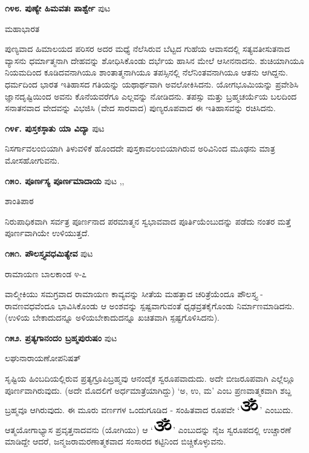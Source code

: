 \medskip
\noindent\textbf{೧೪೮. ಪುಣ್ಯೇ ಹಿಮವತಃ ಪಾರ್ಶ್ವೇ} \hfill ಪುಟ \pageref{118}

\hfill ಮಹಾಭಾರತ

ಪುಣ್ಯವಾದ ಹಿಮಾಲಯದ ಪರಿಸರ ಅದರ ಮಧ್ಯೆ ನೆಲೆಸಿರುವ ಬೆಟ್ಟದ ಗುಹೆಯ ಆವಾಸದಲ್ಲಿ ಸತ್ಯವತೀಸುತನಾದ ವ್ಯಾಸನು ಧರ್ಮಾತ್ಮನಾಗಿ ದೇಹವನ್ನು ಶೋಧಿಸಿಕೊಂಡು ದರ್ಭೆಯ ಹಾಸಿನ ಮೇಲೆ ಆಸೀನನಾದನು. ಶುಚಿಯಾಗಿಯೂ ನಿಯಮದಿಂದ ಕೂಡಿದವನಾಗಿಯೂ ಶಾಂತಾತ್ಮನಾಗಿಯೂ ತಪಸ್ಸಿನಲ್ಲಿ ನೆಲೆನಿಂತವನಾಗಿಯೂ ಆತನು ಆಗಿದ್ದನು. ಧರ್ಮದಿಂದ ಭಾರತ ಇತಿಹಾಸದ ಗತಿಯನ್ನು ಯಥಾರ್ಥವಾಗಿ ಅವಲೋಕಿಸಿದನು. ಯೋಗಭೂಮಿಯನ್ನು ಪ್ರವೇಶಿಸಿ ಜ್ಞಾನದೃಷ್ಟಿಯಿಂದ ಅವನು ಕೊನೆಯವರೆಗೂ ಎಲ್ಲವನ್ನು ನೋಡಿದನು. ತಪಸ್ಸು ಮತ್ತು ಬ್ರಹ್ಮಚರ್ಯೆಯ ಬಲದಿಂದ ಸನಾತನವಾದ ವೇದವನ್ನು ವಿಭಜಿಸಿ (ವೇದ ಸಾರವಾದ) ಪುಣ್ಯರೂಪವಾದ ಈ ಇತಿಹಾಸವನ್ನು ರಚಿಸಿದನು.

\medskip
\noindent\textbf{೧೪೯. ಪುಸ್ತಕಸ್ಠಾತು ಯಾ ವಿದ್ಯಾ} \hfill ಪುಟ \pageref{114}

ನಿಸರ್ಗಾವಲಂಬಿಯಾಗಿ ತಿಳುವಳಿಕೆ ಹೊಂದದೇ ಪುಸ್ತಕಾವಲಂಬಿಯಾಗಿರುವ ಅರಿವಿನಿಂದ ಮೂಢನು ಮಾತ್ರ ಮೋಸಹೋಗುವನು.

\medskip
\noindent\textbf{೧೫೦. ಪೂರ್ಣಸ್ಯ ಪೂರ್ಣಮಾದಾಯ} \hfill ಪುಟ \pageref{23},\pageref{48},\pageref{268}

\hfill ಶಾಂತಿಪಾಠ

ನಿರುಪಾಧಿಕವಾಗಿ ಸರ್ವತ್ರ ಪೂರ್ಣನಾದ ಪರಮಾತ್ಮನ ಸ್ವಭಾವವಾದ ಪೂರ್ತಿಯೆಂಬುದನ್ನು ಪಡೆದು ನಂತರ ಮತ್ತೆ ಪೂರ್ಣವಾಗಿಯೇ ಉಳಿಯುತ್ತದೆ.

\medskip
\noindent\textbf{೧೫೧. ಪೌಲಸ್ತ್ಯವಧಮಿತ್ಯೇವ} \hfill ಪುಟ \pageref{207}

\hfill ರಾಮಾಯಣ ಬಾಲಕಾಂಡ ೪-೭

ವಾಲ್ಮೀಕಿಯು ಸಮಗ್ರವಾದ ರಾಮಾಯಣ ಕಾವ್ಯವನ್ನು ಸೀತೆಯ ಮಹತ್ತಾದ ಚರಿತ್ರೆಯೆಂದೂ ಪೌಲಸ್ತ್ಯ - ರಾವಣವಧವೆಂದೂ ಭಾವಿಸಿಕೊಂಡು ಆ ಅಂಶವನ್ನು ಸ್ಪಷ್ಟವಾಗುವಂತೆ ಧೃಢವ್ರತಕೈಗೊಂಡು ನಿರ್ಮಾಣಮಾಡಿದನು. (ಉಳಿಯ ಬೇಕಾದುದನ್ನೂ ಅಳಿಯಬೇಕಾದುದನ್ನೂ ಖಚಿತವಾಗಿ ಸ್ಪಷ್ಟಗೊಳಿಸಿದನು).

\medskip
\noindent\textbf{೧೫೨. ಪ್ರತ್ಯಗಾನಂದಂ ಬ್ರಹ್ಮಪುರುಷಂ} \hfill ಪುಟ \pageref{106}

\hfill ಲಘುನಾರಾಯಣೋಪನಿಷತ್

ಸೃಷ್ಟಿಯ ಹಿಂಬದಿಯಲ್ಲಿರುವ ಪ್ರತ್ಯಗ್ರೂಪಿಬ್ರಹ್ಮವು ಆನಂದೈಕ ಸ್ವರೂಪವಾದುದು. ಅದೇ ಬೀಜರೂಪವಾಗಿ ಎಲ್ಲೆಲ್ಲೂ ಪೂರ್ಣವಾಗಿರುವುದು. (ಅದೇ ಮೊದಲಿಗೆ ಅರ್ಧಮಾತ್ರೆಯಾಗಿದ್ದು) `ಅ, ಉ, ಮ' ಎಂಬ ಪ್ರಣವಾತ್ಮಕವಾಗಿ ಶಬ್ದ ಬ್ರಹ್ಮವೂ ಆಗಿರುವುದು. ಈ ಮೂರು ವರ್ಣಗಳ ಒಂದುಗೂಡಿದ - ಸಂಹಿತವಾದ ರೂಪವೇ `\includegraphics{Om-PNG.eps}' ಎಂಬುದು. ಆತ್ಮಯೋಗಾಭ್ಯಾಸ ಪ್ರವೃತ್ತನಾದವನು (ಯೋಗಿಯು) ಆ `\includegraphics{Om-PNG.eps}' ಎಂಬುದನ್ನು ನೈಜ ಸ್ವರೂಪದಲ್ಲಿ  ಉಚ್ಚಾರಣೆ ಮಾಡಿದ್ದೇ ಆದರೆ, ಜನ್ಮಜರಾಮರಣಾತ್ಮಕವಾದ ಸಂಸಾರದ ಕಟ್ಟಿನಿಂದ ಬಿಚ್ಚಿಕೊಳ್ಳುವನು. 

